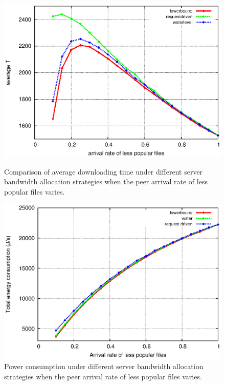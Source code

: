 \documentclass[JIP]{ipsj}
\begin{document}
\begin{figure}[ht]
\centering
\begin{minipage}[b]{0.3\linewidth}
	\includegraphics[scale=0.4]{graphs/pop.eps}
	\caption{Comparison of average downloading time under different server bandwidth allocation strategies when the peer arrival rate of less popular files varies.}
	\label{fig:popsimulation}
\end{minipage}
\hfill
\centering
\begin{minipage}[b]{0.3\linewidth}
	\includegraphics[scale=0.4]{graphs/totalconsumption.eps}
	\caption{Power consumption under different server bandwidth allocation strategies when the peer arrival rate of less popular files varies.}
	\label{fig:totalpop}
\end{minipage}
\label{fig:popularity}
\end{figure}
\end{document}

